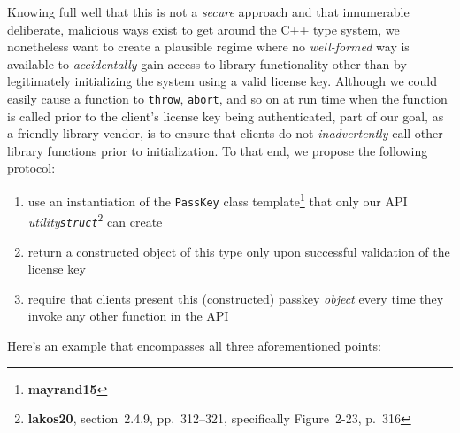 \noindent Knowing full well that this is not a \emph{secure} approach and that
innumerable deliberate, malicious ways exist to get around the C++ type
system, we nonetheless want to create a plausible regime where no
\emph{well-formed} way is available to \emph{accidentally} gain access
to library functionality other than by legitimately initializing the
system using a valid license key. Although we could easily cause a
function to \texttt{throw}, \texttt{abort}, and so on at run time when
the function is called prior to the client's license key being
authenticated, part of our goal, as a friendly library vendor, is to
ensure that clients do not \emph{inadvertently} call other library
functions prior to initialization. To that end, we propose the following protocol:
\begin{enumerate}
\item{use an instantiation of the \texttt{PassKey} class template\cprotect\footnote{\textbf{mayrand15}} that only our API \emph{utility}\linebreak[4] \emph{\texttt{struct}}\cprotect\footnote{\textbf{lakos20}, section~2.4.9, pp.~312--321, specifically Figure~2-23, p.~316} can create}
\item{return a constructed object of this type only upon successful validation of the license key}
\item{require that clients present this (constructed) passkey \emph{object} every time they invoke any other function in the API}
\end{enumerate}
Here's an example that encompasses all three aforementioned points:

